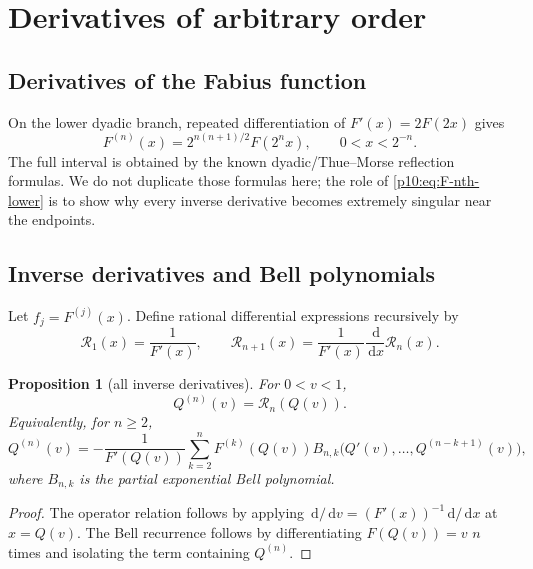 \documentclass[11pt,oneside]{article}
\newtheorem{proposition}[theorem]{Proposition}
\theoremstyle{definition}
\theoremstyle{remark}
\newcommand{\F}{F}
\newcommand{\Q}{Q}
\newcommand{\dd}{\,\mathrm d}
\newcommand{\1}{\mathbf 1}
\begin{document}
\section{Derivatives of arbitrary order}

\subsection{Derivatives of the Fabius function}

On the lower dyadic branch, repeated differentiation of
\(\F'(x)=2\F(2x)\) gives
\begin{equation}\label{p10:eq:F-nth-lower}
 \F^{(n)}(x)=2^{n(n+1)/2}\F(2^nx),
 \qquad 0<x<2^{-n}.
\end{equation}
The full interval is obtained by the known dyadic/Thue--Morse reflection formulas.
We do not duplicate those formulas here; the role of \cref{p10:eq:F-nth-lower} is to show
why every inverse derivative becomes extremely singular near the endpoints.

\subsection{Inverse derivatives and Bell polynomials}

Let \(f_j=\F^{(j)}(x)\).  Define rational differential expressions recursively by
\begin{equation}\label{p10:eq:Rinverse-rec}
 \mathcal R_1(x)=\frac1{\F'(x)},
 \qquad
 \mathcal R_{n+1}(x)=\frac1{\F'(x)}\frac{\dd}{\dd x}\mathcal R_n(x).
\end{equation}

\begin{proposition}[all inverse derivatives]\label{p10:prop:inverse-derivatives}
For \(0<v<1\),
\begin{equation}\label{p10:eq:Q-nth-operator}
 \Q^{(n)}(v)=\mathcal R_n(\Q(v)).
\end{equation}
Equivalently, for \(n\ge2\),
\begin{equation}\label{p10:eq:Q-Bell-rec}
 \Q^{(n)}(v)
 =-\frac1{\F'(\Q(v))}
 \sum_{k=2}^n\F^{(k)}(\Q(v))
 B_{n,k}\bigl(\Q'(v),\ldots,\Q^{(n-k+1)}(v)\bigr),
\end{equation}
where \(B_{n,k}\) is the partial exponential Bell polynomial.
\end{proposition}

\begin{proof}
The operator relation follows by applying \(\dd/\dd v=(\F'(x))^{-1}\dd/\dd x\) at
\(x=\Q(v)\).  The Bell recurrence follows by differentiating
\(\F(\Q(v))=v\) \(n\) times and isolating the term containing \(\Q^{(n)}\).
\end{proof}
\end{document}
